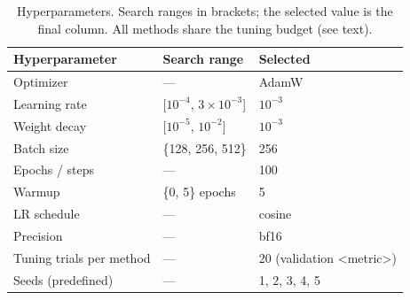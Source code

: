 \begin{table}[t]
  \centering
  \caption{Hyperparameters. Search ranges in brackets; the selected value is
    the final column. All methods share the tuning budget (see text).}
  \label{tab:hyperparameters}
  \begin{tabular}{lll}
    \toprule
    Hyperparameter & Search range & Selected \\
    \midrule
    Optimizer & --- & AdamW \\
    Learning rate & [$10^{-4}$, $3\times10^{-3}$] & $10^{-3}$ \\
    Weight decay & [$10^{-5}$, $10^{-2}$] & $10^{-3}$ \\
    Batch size & \{128, 256, 512\} & 256 \\
    Epochs / steps & --- & 100 \\
    Warmup & \{0, 5\} epochs & 5 \\
    LR schedule & --- & cosine \\
    Precision & --- & bf16 \\
    \midrule
    Tuning trials per method & --- & 20 (validation <metric>) \\
    Seeds (predefined) & --- & 1, 2, 3, 4, 5 \\
    \bottomrule
  \end{tabular}
\end{table}

